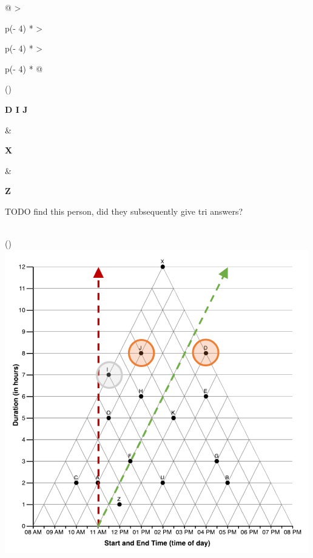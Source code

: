 \documentclass[
  letterpaper,
  DIV=11,
  numbers=noendperiod]{scrreprt}
\begin{document}
\begin{longtable}[]{@{}
  >{\raggedright\arraybackslash}p{(\columnwidth - 4\tabcolsep) * }
  >{\raggedright\arraybackslash}p{(\columnwidth - 4\tabcolsep) * }
  >{\raggedright\arraybackslash}p{(\columnwidth - 4\tabcolsep) * }@{}}
\toprule()
\begin{minipage}[b]{\linewidth}\raggedright
\textbf{D I J}
\end{minipage} & \begin{minipage}[b]{\linewidth}\raggedright
\textbf{X}
\end{minipage} & \begin{minipage}[b]{\linewidth}\raggedright
\textbf{Z}

TODO find this person, did they subsequently give tri answers?
\end{minipage} \\
\midrule()
\endhead
\includegraphics[width=5.20833in,height=\textheight]{analysis/SGC3A/static/interpretations/Q1_111_IJD.png}

\end{longtable}
\end{document}

